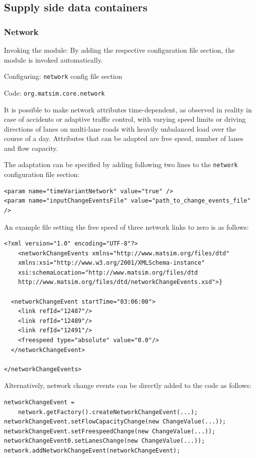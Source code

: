 \subsection{Supply side data containers}
\label{sec:supplysidemodules}
\subsubsection{Network}
\label{sec:network}
\begin{compactitem}
\item Invoking the module: By adding the respective configuration file section, the module is invoked automatically.
\item Configuring: \lstinline|network| config file section
\item Code: \lstinline|org.matsim.core.network|
\end{compactitem}

It is possible to make network attributes time-dependent, as observed in reality in case of accidents or adaptive traffic control, with varying speed limits or driving directions of lanes on multi-lane roads with heavily unbalanced load over the course of a day. Attributes that can be adapted are free speed, number of lanes and flow capacity.

The adaptation can be specified by adding following two lines to the \lstinline|network| configuration file section:
\begin{lstlisting}
<param name="timeVariantNetwork" value="true" />
<param name="inputChangeEventsFile" value="path_to_change_events_file" />
\end{lstlisting}
%
An example file setting the free speed of three network links to zero is as follows:
%
\begin{lstlisting}
<?xml version="1.0" encoding="UTF-8"?>
	<networkChangeEvents xmlns="http://www.matsim.org/files/dtd"
	xmlns:xsi="http://www.w3.org/2001/XMLSchema-instance"
	xsi:schemaLocation="http://www.matsim.org/files/dtd
	http://www.matsim.org/files/dtd/networkChangeEvents.xsd">}

  <networkChangeEvent startTime="03:06:00">
    <link refId="12487"/>
    <link refId="12489"/>
    <link refId="12491"/>
    <freespeed type="absolute" value="0.0"/>
  </networkChangeEvent>

</networkChangeEvents>
\end{lstlisting}
%
Alternatively, network change events can be directly added to the code as follows:
\begin{lstlisting}
networkChangeEvent =
	network.getFactory().createNetworkChangeEvent(...);
networkChangeEvent.setFlowCapacityChange(new ChangeValue(...));
networkChangeEvent.setFreespeedChange(new ChangeValue(...));
networkChangeEvent0.setLanesChange(new ChangeValue(...));
network.addNetworkChangeEvent(networkChangeEvent);
\end{lstlisting}

